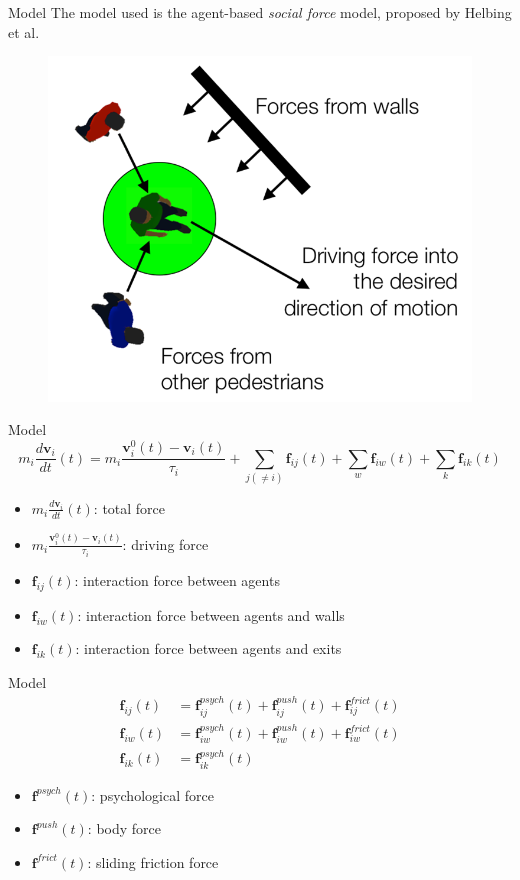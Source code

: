 \documentclass[aspectratio=43]{beamer}
\begin{document}
\begin{frame}{Model}
	The model used is the agent-based \emph{social force} model, proposed by Helbing et al.
	
	\begin{figure}
		\includegraphics[width=0.6\linewidth]{social_force.png}
	\end{figure}
\end{frame}


\begin{frame}{Model}
	\begin{equation*}
		m_i \frac{d\bm{v}_i}{dt}(t) = m_i \frac{\bm{v}_i^0(t) -\bm{v}_i(t)}{\tau_i} + \sum_{j(\neq i)}^{}\bm{f}_{ij}(t) + \sum_{w}^{}\bm{f}_{iw}(t) + \sum_{k}^{}\bm{f}_{ik}(t)
	\end{equation*}
	
	\begin{itemize}
		\item $m_i \frac{d\bm{v}_i}{dt}(t)$: total force
		\smallskip
		\item $ m_i \frac{\bm{v}_i^0(t) -\bm{v}_i(t)}{\tau_i}$: driving force
		\smallskip
		\item $\bm{f}_{ij}(t)$: interaction force between agents
		\smallskip
		\item $\bm{f}_{iw}(t)$: interaction force between agents and walls
		\smallskip
		\item $\bm{f}_{ik}(t)$: interaction force between agents and exits
	\end{itemize}
\end{frame}


\begin{frame}{Model}
	\begin{equation*}
	\begin{split}
		\bm{f}_{ij}(t) & = \bm{f}_{ij}^{psych}(t) + \bm{f}_{ij}^{push}(t) + \bm{f}_{ij}^{frict}(t) \\
		\bm{f}_{iw}(t) & = \bm{f}_{iw}^{psych}(t) + \bm{f}_{iw}^{push}(t) + \bm{f}_{iw}^{frict}(t) \\
		\bm{f}_{ik}(t) & =\bm{f}_{ik}^{psych}(t)
	\end{split}
	\end{equation*}
	
	\begin{itemize}
		\item $\bm{f}^{psych}(t)$: psychological force
		\smallskip
		\item $\bm{f}^{push}(t)$: body force
		\smallskip
		\item $\bm{f}^{frict}(t)$: sliding friction force
	\end{itemize}
\end{frame}
\end{document}
